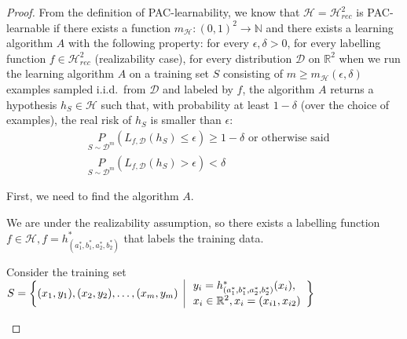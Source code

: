 \documentclass{article}
\newcommand{\<}{\langle}
\renewcommand{\>}{\rangle}
\theoremstyle{definition}
\def\gD{{\mathcal{D}}}
\def\gH{{\mathcal{H}}}
\def\sN{{\mathbb{N}}}
\def\sR{{\mathbb{R}}}
\newcommand{\uset}{\underset}
\newcommand{\hrs}{\gH_{rec}^2}
\newcommand{\mgh}{m_{\gH}}
\newcommand{\hs}{h_S}
\newcommand{\sRs}{\sR^2}
\newcommand{\uset}{\underset}
\newcommand{\hrs}{\gH_{rec}^2}
\newcommand{\mgh}{m_{\gH}}
\newcommand{\hs}{h_S}
\newcommand{\sRs}{\sR^2}
\begin{document}
\begin{proof}
From the definition of PAC-learnability, we know that $\gH=\hrs$ is PAC-learnable
if there exists a function $\mgh \colon (0, 1)^2 \rightarrow \sN$ and there exists
a learning algorithm $A$ with the following property: for every $\epsilon, \delta > 0$,
for every labelling function $f \in \hrs$ (realizability case), for every distribution
$\gD$ on $\sRs$ when we run the learning algorithm $A$ on a training set $S$ consisting of
$m \geq \mgh(\epsilon, \delta)$ examples sampled i.i.d.\ from $\gD$ and labeled by $f$,
the algorithm $A$ returns a hypothesis $\hs \in \gH$ such that, with probability at least
$1-\delta$ (over the choice of examples), the real risk of $\hs$ is smaller than $\epsilon$:
\begin{align*}
&\uset{S \sim {\gD}^m}{P} (L_{f, \gD}(\hs) \leq \epsilon) \geq 1-\delta
\text{ or otherwise said} \\
&\uset{S \sim {\gD}^m}{P} (L_{f, \gD}(\hs) > \epsilon) < \delta
\end{align*}

First, we need to find the algorithm $A$.

We are under the realizability assumption, so there exists a labelling function
$f \in \gH, f = h_{(a_1^*, b_1^*, a_2^*, b_2^*)}^*$ that labels the training data.

Consider the training set $S = \left\{(x_1, y_1), (x_2, y_2), \dots, (x_m, y_m)
                                 \; \; \vline \;
                                 \begin{array}{ll}
                                   y_i = h_{(a_1^*, b_1^*, a_2^*, b_2^*)}^*(x_i), \\
                                   x_i \in \sRs, x_i = (x_{i1}, x_{i2})
                                 \end{array}
                               \right\}$

\begin{figure}[h]
\end{figure}
\end{proof}
\end{document}
